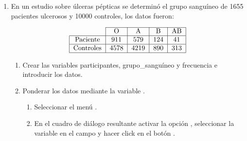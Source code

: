\begin{enumerate}[leftmargin=*]
\begin{enumerate}
\item Comprobar si esta muestra cumple las leyes de Mendel.
\begin{indicacion}
\begin{enumerate}
\item Seleccionar el men\'{u} \texttt{Analizar\flecha Pruebas no paramétricas\flecha Cuadro de diálogo antiguos\flecha Chi-cuadrado}.
\item En el cuadro de diálogo que aparece seleccionar la variable  al campo , y en \texttt{Valores esperados} marcar la opción  e
introducir las proporciones según las leyes de Mendel y siguiendo
el orden en el que aparecen los fenotipos, y hacer click sobre el botón .
\end{enumerate}
\end{indicacion}

\item A la vista de los resultados del contraste, ¿se puede aceptar que se cumplen las leyes de Mendel en los individuos de dicha población?
\end{enumerate}


\item En un estudio sobre úlceras pépticas se determinó el grupo
sanguíneo de 1655 pacientes ulcerosos y 10000 controles, los datos
fueron:

\[
\begin{tabular}{|l|l|l|l|l|}
\cline{2-5}
\multicolumn{1}{c|}{} & \multicolumn{1}{c|}{O} & \multicolumn{1}{c|}{A} & \multicolumn{1}{c|}{B} & \multicolumn{1}{c|}{AB} \\
\hline
\multicolumn{1}{|c|}{Paciente} & \multicolumn{1}{c|}{911} & \multicolumn{1}{c|}{579} & \multicolumn{1}{c|}{124} & \multicolumn{1}{c|}{41} \\
\hline
\multicolumn{1}{|c|}{Controles} & \multicolumn{1}{c|}{4578} & \multicolumn{1}{c|}{4219} & \multicolumn{1}{c|}{890} & \multicolumn{1}{c|}{313} \\
\hline
\end{tabular}
\]

\begin{enumerate}
\item Crear las variables \textsf{participantes}, \textsf{grupo\_sanguíneo} y \textsf{frecuencia} e introducir los datos.
\item Ponderar los datos mediante la variable .
\begin{indicacion}
\begin{enumerate}
\item Seleccionar el menú .
\item En el cuadro de diálogo resultante activar la opción , seleccionar la variable  en el campo  y hacer click en el botón .
\end{enumerate}
\end{indicacion}


\end{enumerate}
\end{enumerate}
